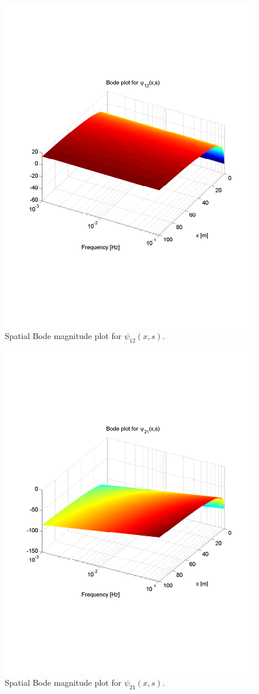 \documentclass[preprint]{elsarticle}
\begin{document}
\begin{figure}[H]
\centering
\includegraphics[trim = 0mm 60mm 0mm 60mm, width = 120mm]{distr12_-3to-1}
\caption{Spatial Bode magnitude plot for $\psi_{12}(x,s)$.}
\end{figure}

\begin{figure}[H]
\centering
\includegraphics[trim = 0mm 60mm 0mm 60mm, width = 120mm]{distr21_-3to-1}
\caption{Spatial Bode magnitude plot for $\psi_{21}(x,s)$.}
\end{figure}
\end{document}
